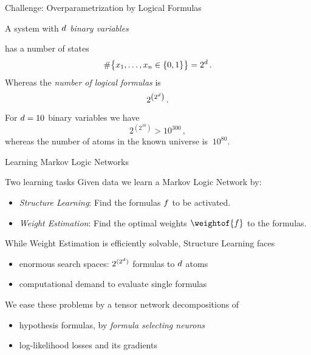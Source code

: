 \documentclass{beamer}
\begin{document}
\begin{frame}{Challenge: Overparametrization by Logical Formulas}

A system with \emph{$d$ binary variables}
\begin{center}
	
\end{center}
has a number of states
	\[ \#\big\{x_1, \ldots, x_n \in \{0,1\} \big\} = 2^d \, .  \]
Whereas the \emph{number of logical formulas} is
	\[ 2^{\left(2^d\right)} \, . \]
For $d = 10$ binary variables we have
	\[2^{\left(2^{10}\right)} >10^{300} \, , \]
whereas the number of atoms in the known universe is $~10^{80}$.

\end{frame}




\begin{frame}{Learning Markov Logic Networks}
	
	\begin{block}{Two learning tasks}
		Given data we learn a Markov Logic Network by:
		\begin{itemize}
			\item \emph{Structure Learning}: Find the formulas $f$ to be activated.
			\item \emph{Weight Estimation}: Find the optimal weights $\weightof{\exformula}$ to the formulas.
		\end{itemize}
	\end{block}
	
	While Weight Estimation is efficiently solvable, Structure Learning faces
	\begin{itemize}
		\item enormous search spaces: $2^{(2^d)}$ formulas to $d$ atoms
		\item computational demand to evaluate single formulas
	\end{itemize}
	
	\medskip
	We ease these problems by a tensor network decompositions of
	\begin{itemize}
		\item hypothesis formulas, by \emph{formula selecting neurons}
		\item log-likelihood losses and its gradients 
	\end{itemize}
\end{frame}
\end{document}
